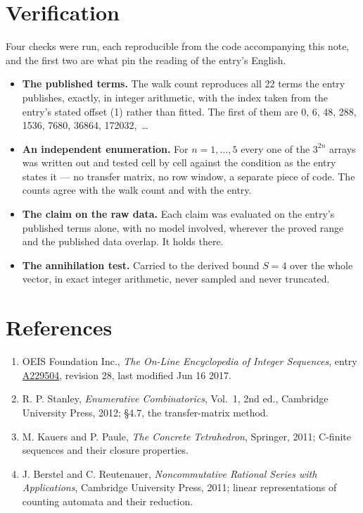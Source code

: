 \documentclass[11pt]{article}
\theoremstyle{definition}
\begin{document}
\section{Verification}

Four checks were run, each reproducible from the code accompanying this note, and the first two are what pin the reading of the entry's English.

\begin{itemize}

\item {\bfseries The published terms.} The walk count reproduces all 22 terms the entry publishes, exactly, in integer arithmetic, with the index taken from the entry's stated offset (1) rather than fitted. The first of them are 0, 6, 48, 288, 1536, 7680, 36864, 172032,~\dots

\item {\bfseries An independent enumeration.} For $n = 1,\dots,5$ every one of the $3^{2n}$ arrays was written out and tested cell by cell against the condition as the entry states it --- no transfer matrix, no row window, a separate piece of code. The counts agree with the walk count and with the entry.

\item {\bfseries The claim on the raw data.} Each claim was evaluated on the entry's published terms alone, with no model involved, wherever the proved range and the published data overlap. It holds there.

\item {\bfseries The annihilation test.} Carried to the derived bound $S = 4$ over the whole vector, in exact integer arithmetic, never sampled and never truncated.

\end{itemize}

\section{References}

\begin{enumerate}

\item OEIS Foundation Inc., \emph{The On-Line Encyclopedia of Integer Sequences}, entry \href{https://oeis.org/A229504}{A229504}, revision 28, last modified Jun 16 2017.

\item R. P. Stanley, \emph{Enumerative Combinatorics}, Vol.~1, 2nd ed., Cambridge University Press, 2012; \S4.7, the transfer-matrix method.

\item M. Kauers and P. Paule, \emph{The Concrete Tetrahedron}, Springer, 2011; C-finite sequences and their closure properties.

\item J. Berstel and C. Reutenauer, \emph{Noncommutative Rational Series with Applications}, Cambridge University Press, 2011; linear representations of counting automata and their reduction.

\end{enumerate}
\end{document}
